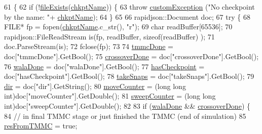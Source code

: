 \begin{DoxyCode}
61                                      \{
62     \textcolor{keywordflow}{if} (!\hyperlink{utilities_8cpp_a9d1e3672fd331d4185c1763c80226307}{fileExists}(\hyperlink{classcheckpoint_a477eea21621f066889660ed426dc800f}{chkptName})) \{
63         \textcolor{keywordflow}{throw} \hyperlink{classcustom_exception}{customException} (\textcolor{stringliteral}{"No checkpoint by the name: "}+
      \hyperlink{classcheckpoint_a477eea21621f066889660ed426dc800f}{chkptName});
64     \}
65 
66     rapidjson::Document doc;
67     \textcolor{keywordflow}{try} \{
68         FILE* fp = fopen(\hyperlink{classcheckpoint_a477eea21621f066889660ed426dc800f}{chkptName}.c\_str(), \textcolor{stringliteral}{"r"});
69         \textcolor{keywordtype}{char} readBuffer[65536];
70         rapidjson::FileReadStream is(fp, readBuffer, \textcolor{keyword}{sizeof}(readBuffer) );
71         doc.ParseStream(is);
72         fclose(fp);
73 
74         \hyperlink{classcheckpoint_acbe0c62aa82735741a9f396827966823}{tmmcDone} = doc[\textcolor{stringliteral}{"tmmcDone"}].GetBool();
75         \hyperlink{classcheckpoint_a4f13612ea6d376bb327295bfce3a70c5}{crossoverDone} = doc[\textcolor{stringliteral}{"crossoverDone"}].GetBool();
76         \hyperlink{classcheckpoint_aab066479e2ca6656d0031dd46a2fc1a5}{walaDone} = doc[\textcolor{stringliteral}{"walaDone"}].GetBool();
77         \hyperlink{classcheckpoint_aa75f306fcb0c2360d948fa3a61adfed5}{hasCheckpoint} = doc[\textcolor{stringliteral}{"hasCheckpoint"}].GetBool();
78         \hyperlink{classcheckpoint_a685226e8bae8084937f73f65c326c362}{takeSnaps} = doc[\textcolor{stringliteral}{"takeSnaps"}].GetBool();
79         \hyperlink{classcheckpoint_a0e0f999ee8e0b09541e9131baa8a591d}{dir} = doc[\textcolor{stringliteral}{"dir"}].GetString();
80         \hyperlink{classcheckpoint_a5ab49a355714da4874aba00eb03f701d}{moveCounter} = (\textcolor{keywordtype}{long} \textcolor{keywordtype}{long} int)doc[\textcolor{stringliteral}{"moveCounter"}].GetDouble();
81         \hyperlink{classcheckpoint_ad011ddbca1ea708321335b1b3ac67e07}{sweepCounter} = (\textcolor{keywordtype}{long} \textcolor{keywordtype}{long} int)doc[\textcolor{stringliteral}{"sweepCounter"}].GetDouble();
82 
83         \textcolor{keywordflow}{if} (\hyperlink{classcheckpoint_aab066479e2ca6656d0031dd46a2fc1a5}{walaDone} && \hyperlink{classcheckpoint_a4f13612ea6d376bb327295bfce3a70c5}{crossoverDone}) \{
84             \textcolor{comment}{// in final TMMC stage or just finished the TMMC (end of simulation)}
85             \hyperlink{classcheckpoint_ab8f6081561b8c7871eea6743d4988d8a}{resFromTMMC} = \textcolor{keyword}{true};

\end{DoxyCode}
